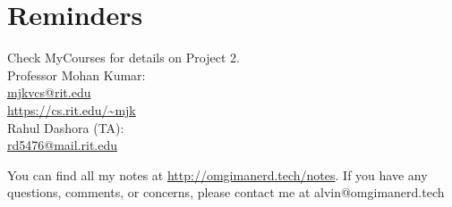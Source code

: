 \documentclass{math}
\begin{document}
\section*{Reminders}
Check MyCourses for details on Project 2. \\
\noindent Professor Mohan Kumar: \\
\url{mjkvcs@rit.edu} \\
\url{https://cs.rit.edu/~mjk} \\

\noindent Rahul Dashora (TA): \\
\url{rd5476@mail.rit.edu} \\

\begin{center}
  You can find all my notes at \url{http://omgimanerd.tech/notes}. If you have
  any questions, comments, or concerns, please contact me at
  alvin@omgimanerd.tech
\end{center}
\end{document}

